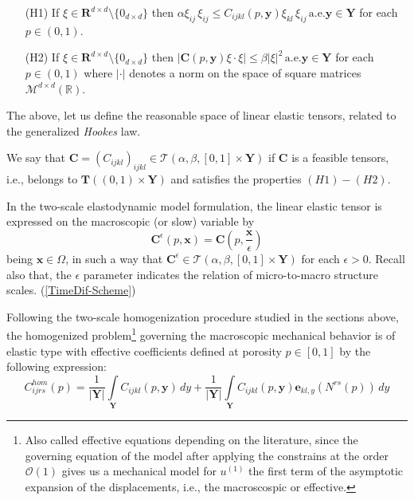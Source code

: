 \begin{enumerate}
    \item[(H1)] If $\xi \in \mathbf{R}^{d\times d} \setminus \{0_{d \times d}\}$ then $\alpha \xi_{ij} \, \xi_{ij} \leq C_{ijkl}(p,\mathbf{y})  \xi_{kl}\,\xi_{ij}\, \text{a.e.} \mathbf{y} \in \mathbf{Y}$ for each $p \in (0,1)$.
    \item[(H2)] If $\xi \in \mathbf{R}^{d\times d} \setminus \{0_{d \times d}\}$ then $\vert \mathbf{C}(p,\mathbf{y}) \xi\cdot \xi \vert \leq \beta \vert \xi \vert^2 \, \text{a.e.}\mathbf{y} \in \mathbf{Y}$ for each $p \in (0,1)$ where $\vert \cdot \vert$ denotes a norm on the space of square matrices $\mathcal{M}^{d\times d}(\mathbb{R})$.
\end{enumerate}
The above, let us define the reasonable space of linear elastic tensors, related to the generalized \textit{Hookes} law.
\begin{defn}
We say that $\mathbf{C} = (C_{ijkl})_{ijkl} \in \mathcal{T}(\alpha, \beta, [0,1]\times \mathbf{Y})$
if $\mathbf{C}$ is a feasible tensors, i.e., belongs to $\mathbf{T}((0,1)\times \mathbf{Y})$ and satisfies the properties $(H1)-(H2)$.
\end{defn}
\begin{rem}
In the two-scale elastodynamic model formulation, the linear elastic tensor is expressed on the macroscopic (or slow) variable by
\begin{equation*}
    \mathbf{C}^{\epsilon}(p,\mathbf{x}) =\mathbf{C}(p,\frac{\mathbf{x}}{\epsilon})
\end{equation*} being $\mathbf{x}\in \Omega$, in such a way that $\mathbf{C}^{\epsilon} \in \mathcal{T}(\alpha, \beta, [0,1]\times \mathbf{Y})$ for each $\epsilon >0$. Recall also that, the $\epsilon$ parameter indicates the relation of micro-to-macro structure scales. (\ref{TimeDif-Scheme})
\end{rem}
Following the two-scale homogenization procedure studied in the sections above, the homogenized problem\footnote{Also called effective equations depending on the literature, since the governing equation of the model after applying the constrains at the order $\mathcal{O}(1)$ gives us a mechanical model for $u^{(1)}$ the first term of the asymptotic expansion of the displacements, i.e., the macroscospic or effective.} governing the macroscopic mechanical behavior is of elastic type with effective coefficients defined at porosity $p \in [0,1]$ by the following expression:
\begin{equation}
    \label{eq:homogenized-coeff}
    C^{hom}_{ijrs}(p) = \frac{1}{\vert \mathbf{Y}\vert} \int\limits_{\mathbf{Y}} C_{ijkl}(p,\mathbf{y}) \, dy + \frac{1}{\vert \mathbf{Y}\vert} \int\limits_{\mathbf{Y}} C_{ijkl}(p,\mathbf{y}) \mathbf{e}_{kl,y}( N^{rs}(p))\,dy
\end{equation}
